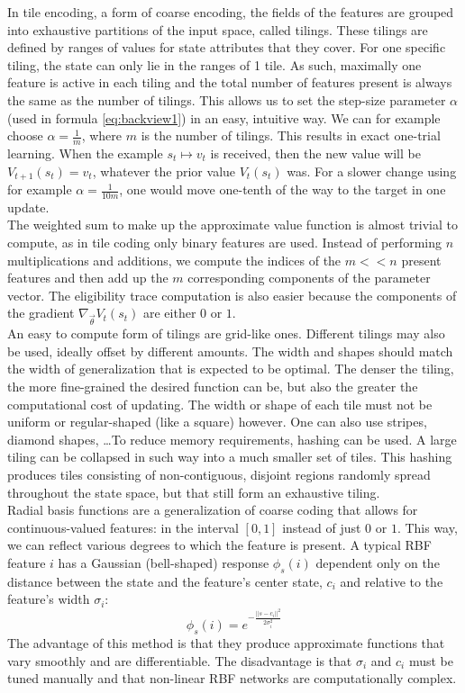 In tile encoding, a form of coarse encoding, the fields of the features are grouped into exhaustive partitions of the input space, called tilings.
These tilings are defined by ranges of values for state attributes that they cover.
For one specific tiling, the state can only lie in the ranges of 1 tile.
As such, maximally one feature is active in each tiling and the total number of features present is always the same as the number of tilings.
This allows us to set the step-size parameter $\alpha$ (used in formula \ref{eq:backview1}) in an easy, intuitive way.
We can for example choose $\alpha = \frac{1}{m}$, where $m$ is the number of tilings.
This results in exact one-trial learning.
When the example $s_t \mapsto v_t$ is received, then the new value will be $V_{t+1}(s_t) = v_t$, whatever the prior value $V_t(s_t)$ was.
For a slower change using for example $\alpha=\frac{1}{10m}$, one would move one-tenth of the way to the target in one update.\\
The weighted sum to make up the approximate value function is almost trivial to compute, as in tile coding only binary features are used.
Instead of performing $n$ multiplications and additions, we compute the indices of the $m<<n$ present features and then add up the $m$ corresponding components of the parameter vector.
The eligibility trace computation is also easier because the components of the gradient $\nabla_{\overrightarrow{\theta}} V_t(s_t)$ are either $0$ or $1$.\\
An easy to compute form of tilings are grid-like ones.
Different tilings may also be used, ideally offset by different amounts.
The width and shapes should match the width of generalization that is expected to be optimal.
The denser the tiling, the more fine-grained the desired function can be, but also the greater the computational cost of updating.
The width or shape of each tile must not be uniform or regular-shaped (like a square) however.
One can also use stripes, diamond shapes, \dots To reduce memory requirements, hashing can be used.
A large tiling can be collapsed in such way into a much smaller set of tiles.
This hashing produces tiles consisting of non-contiguous, disjoint regions randomly spread throughout the state space, but that still form an exhaustive tiling.\\

Radial basis functions are a generalization of coarse coding that allows for continuous-valued features: in the interval $[0,1]$ instead of just $0$ or $1$.
This way, we can reflect various degrees to which the feature is present.
A typical RBF feature $i$ has a Gaussian (bell-shaped) response $\phi_s(i)$ dependent only on the distance between the state and the feature's center state, $c_i$ and relative to the feature's width $\sigma_i$:
\begin{equation}
\phi_s(i) = e^{-\frac{||s-c_i||^2}{2 \sigma^2_i}}
\end{equation}
The advantage of this method is that they produce approximate functions that vary smoothly and are differentiable.
The disadvantage is that $\sigma_i$ and $c_i$ must be tuned manually and that non-linear RBF networks are computationally complex.

